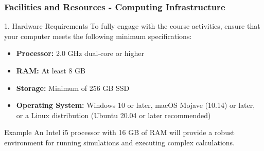 \documentclass[aspectratio=169]{beamer}
\begin{document}
\begin{frame}[fragile]
    \frametitle{Facilities and Resources - Computing Infrastructure}
    \begin{block}{1. Hardware Requirements}
        To fully engage with the course activities, ensure that your computer meets the following minimum specifications:
        \begin{itemize}
            \item \textbf{Processor:} 2.0 GHz dual-core or higher
            \item \textbf{RAM:} At least 8 GB
            \item \textbf{Storage:} Minimum of 256 GB SSD
            \item \textbf{Operating System:} Windows 10 or later, macOS Mojave (10.14) or later, or a Linux distribution (Ubuntu 20.04 or later recommended)
        \end{itemize}
    \end{block}
    \begin{block}{Example}
        An Intel i5 processor with 16 GB of RAM will provide a robust environment for running simulations and executing complex calculations.
    \end{block}
\end{frame}
\end{document}
